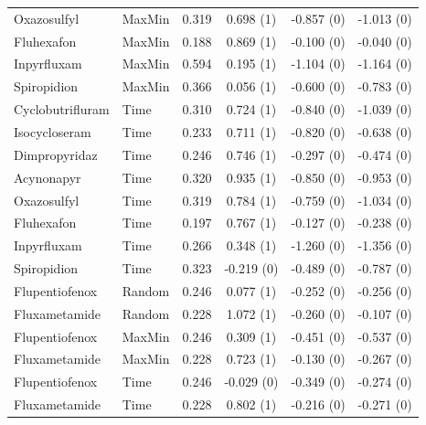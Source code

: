 \begin{longtable}{llcccc}
Oxazosulfyl & MaxMin & 0.319 & 0.698 (1) & -0.857 (0) & -1.013 (0) \\

Fluhexafon & MaxMin & 0.188 & 0.869 (1) & -0.100 (0) & -0.040 (0) \\

Inpyrfluxam & MaxMin & 0.594 & 0.195 (1) & -1.104 (0) & -1.164 (0) \\

Spiropidion & MaxMin & 0.366 & 0.056 (1) & -0.600 (0) & -0.783 (0) \\

Cyclobutrifluram & Time & 0.310 & 0.724 (1) & -0.840 (0) & -1.039 (0) \\

Isocycloseram & Time & 0.233 & 0.711 (1) & -0.820 (0) & -0.638 (0) \\

Dimpropyridaz & Time & 0.246 & 0.746 (1) & -0.297 (0) & -0.474 (0) \\

Acynonapyr & Time & 0.320 & 0.935 (1) & -0.850 (0) & -0.953 (0) \\

Oxazosulfyl & Time & 0.319 & 0.784 (1) & -0.759 (0) & -1.034 (0) \\

Fluhexafon & Time & 0.197 & 0.767 (1) & -0.127 (0) & -0.238 (0) \\

Inpyrfluxam & Time & 0.266 & 0.348 (1) & -1.260 (0) & -1.356 (0) \\

Spiropidion & Time & 0.323 & -0.219 (0) & -0.489 (0) & -0.787 (0) \\

Flupentiofenox & Random & 0.246 & 0.077 (1) & -0.252 (0) & -0.256 (0) \\

Fluxametamide & Random & 0.228 & 1.072 (1) & -0.260 (0) & -0.107 (0) \\

Flupentiofenox & MaxMin & 0.246 & 0.309 (1) & -0.451 (0) & -0.537 (0) \\

Fluxametamide & MaxMin & 0.228 & 0.723 (1) & -0.130 (0) & -0.267 (0) \\

Flupentiofenox & Time & 0.246 & -0.029 (0) & -0.349 (0) & -0.274 (0) \\

Fluxametamide & Time & 0.228 & 0.802 (1) & -0.216 (0) & -0.271 (0) \\

\end{longtable}\endgroup

